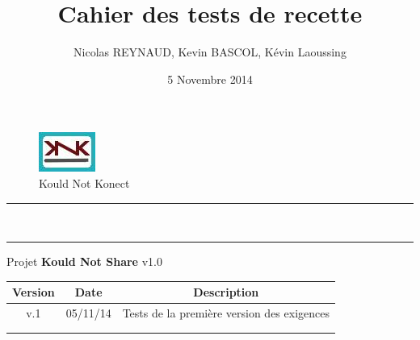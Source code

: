 \documentclass[10pt,a4paper,landscape]{report}
\author{Nicolas REYNAUD, Kevin BASCOL, Kévin Laoussing}
\title{Cahier des tests de recette}
\date{5 Novembre 2014}
\begin{document}
\makeatletter
	\begin{titlepage}
	
	\begin{figure}
		\begin{minipage}[c]{.46\linewidth}
		\end{minipage} \hfill
		\begin{minipage}[c]{.20\linewidth}
			\begin{center}
				\includegraphics{../Logo/logoKNK.jpg}\\
				{\large Kould Not Konect}
			\end{center}
		\end{minipage}
	\vspace{1cm}
	\end{figure}
	
	\centering
		{
		\hrule height 2pt
		\vspace{0.7cm}
		\Huge \textbf{\@title}}\\
		\vspace{0.7cm}
		\hrule height 2pt
		\vspace{1.5cm}
		{\LARGE  Projet \textbf{Kould Not Share} v1.0}
		
		\vfill
		
		\begin{tabular}{|c|c|c|}
			\hline
			Version & Date & Description\\
			\hline
			v.1 & 05/11/14 & Tests de la première version des exigences\\
			\hline
			 & & \\
			\hline
			 & & \\
			\hline
		\end{tabular}\\
		\vspace{1cm}
		\@author\\
		\end{titlepage}
\makeatother
\setcounter{secnumdepth}{5}
\setcounter{tocdepth}{5}
\renewcommand{\contentsname}{Sommaire}
\begingroup\makeatletter
\def\@makeschapterhead#1{%
  {\parindent \z@ \raggedright
    \normalfont
    \interlinepenalty\@M
    \Huge \bfseries  #1\par\nobreak
    \vskip 20pt%
  }}\makeatother
\tableofcontents
\endgroup
\thispagestyle{empty}
\setcounter{page}{0}
\newpage
\end{document}
